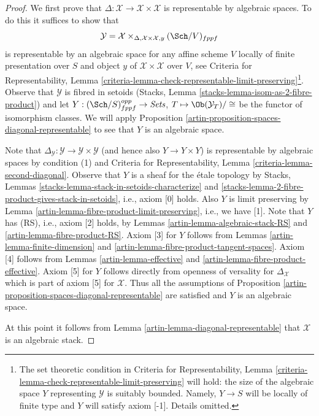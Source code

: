 \begin{proof}

We first prove that $\Delta : \mathcal{X} \to \mathcal{X} \times \mathcal{X}$
is representable by algebraic spaces. To do this it suffices to show
that
$$
\mathcal{Y} =
\mathcal{X} \times_{\Delta, \mathcal{X} \times \mathcal{X}, y} (\Sch/V)_{fppf}
$$
is representable by an algebraic space for any affine scheme $V$ locally
of finite presentation over $S$ and object $y$ of
$\mathcal{X} \times \mathcal{X}$ over $V$, see
Criteria for Representability, Lemma
\ref{criteria-lemma-check-representable-limit-preserving}\footnote{The
set theoretic condition in Criteria for Representability, Lemma
\ref{criteria-lemma-check-representable-limit-preserving}
will hold: the size of the algebraic space $Y$ representing $\mathcal{Y}$ is
suitably bounded. Namely, $Y \to S$ will be locally of finite type and $Y$
will satisfy axiom [-1]. Details omitted.}.
Observe that $\mathcal{Y}$ is fibred in setoids
(Stacks, Lemma \ref{stacks-lemma-isom-as-2-fibre-product})
and let $Y : (\Sch/S)_{fppf}^{opp} \to \textit{Sets}$,
$T \mapsto \Ob(\mathcal{Y}_T)/\cong$ be the functor of isomorphism
classes. We will apply
Proposition \ref{artin-proposition-spaces-diagonal-representable}
to see that $Y$ is an algebraic space.

\medskip\noindent
Note that
$\Delta_\mathcal{Y} : \mathcal{Y} \to \mathcal{Y} \times \mathcal{Y}$
(and hence also $Y \to Y \times Y$)
is representable by algebraic spaces by condition (1) and
Criteria for Representability, Lemma \ref{criteria-lemma-second-diagonal}.
Observe that $Y$ is a sheaf for the \'etale topology by
Stacks, Lemmas \ref{stacks-lemma-stack-in-setoids-characterize} and
\ref{stacks-lemma-2-fibre-product-gives-stack-in-setoids}, i.e.,
axiom [0] holds. Also $Y$ is limit preserving by
Lemma \ref{artin-lemma-fibre-product-limit-preserving}, i.e., we have [1].
Note that $Y$ has (RS), i.e., axiom [2] holds, by
Lemmas \ref{artin-lemma-algebraic-stack-RS} and
\ref{artin-lemma-fibre-product-RS}. Axiom [3] for $Y$ follows
from Lemmas \ref{artin-lemma-finite-dimension} and
\ref{artin-lemma-fibre-product-tangent-spaces}.
Axiom [4] follows from Lemmas \ref{artin-lemma-effective} and
\ref{artin-lemma-fibre-product-effective}.
Axiom [5] for $Y$ follows directly from openness of versality
for $\Delta_\mathcal{X}$ which is part of axiom [5] for $\mathcal{X}$.
Thus all the assumptions of
Proposition \ref{artin-proposition-spaces-diagonal-representable}
are satisfied and $Y$ is an algebraic space.

\medskip\noindent
At this point it follows from Lemma \ref{artin-lemma-diagonal-representable}
that $\mathcal{X}$ is an algebraic stack.
\end{proof}

